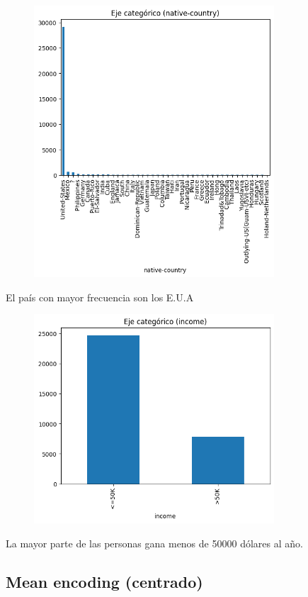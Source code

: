 \documentclass{article}
\begin{document}
	
	\begin{figure}[H]
		\centering
		\includegraphics[width=0.8\textwidth]{native-country.png}  
	\end{figure}
	El país con mayor frecuencia son los E.U.A
	\begin{figure}[H]
		\centering
		\includegraphics[width=0.8\textwidth]{income.png}  
	\end{figure}
	La mayor parte de las personas gana menos de 50000 dólares al año.
	
	\subsection{Mean encoding (centrado)}
	
\end{document}

